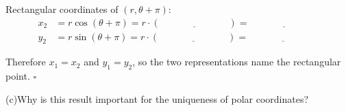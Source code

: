 \documentclass[10pt]{article}
\begin{document}
\begin{tcolorbox}[colback=white, colframe=black!40,
    title=\textbf{Tier E --- Extend},
    fonttitle=\bfseries, arc=2mm, left=3mm, right=3mm, top=2mm, bottom=2mm]
Rectangular coordinates of $(r,\theta+\pi)$:
\begin{align*}
x_2 &= r\cos(\theta+\pi) = r \cdot (\underline{\hspace{3cm}}) = \underline{\hspace{3cm}} \\
y_2 &= r\sin(\theta+\pi) = r \cdot (\underline{\hspace{3cm}}) = \underline{\hspace{3cm}}
\end{align*}

Therefore $x_1 = x_2$ and $y_1 = y_2$, so the two representations name the
\underline{\hspace{2cm}} rectangular point. \qquad $\square$

\vspace{6pt}
(c)\quad Why is this result important for the uniqueness of polar coordinates?


\end{tcolorbox}
\end{document}
